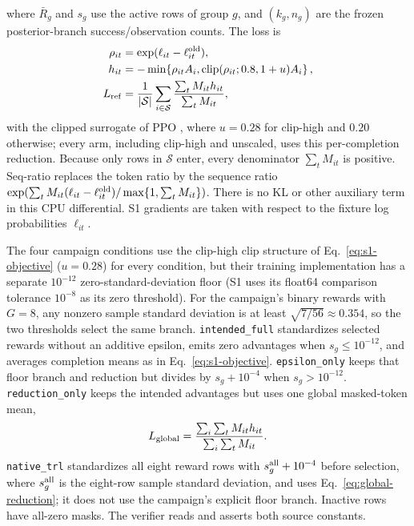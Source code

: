 \documentclass{article}
\begin{document}
where $\bar R_g$ and $s_g$ use the active rows of group $g$, and $(k_g,n_g)$
are the frozen posterior-branch success/observation counts.  The loss is
\begin{align}
 \rho_{it}&=\exp(\ell_{it}-\ell^{\rm old}_{it}), \nonumber\\
 h_{it}&=-\min\!\left\{\rho_{it}A_i,
     \operatorname{clip}(\rho_{it};0.8,1+u)A_i\right\}, \nonumber\\
 L_{\rm ref}&=\frac{1}{|\mathcal S|}\sum_{i\in\mathcal S}
   \frac{\sum_t M_{it}h_{it}}{\sum_t M_{it}},
 \label{eq:s1-objective}
\end{align}
with the clipped surrogate of PPO \citep{schulman2017ppo},
where $u=0.28$ for clip-high and $0.20$ otherwise; every arm, including
clip-high and unscaled, uses this per-completion reduction.  Because only rows in $\mathcal S$
enter, every denominator $\sum_tM_{it}$ is positive.  Seq-ratio replaces the token
ratio by the sequence ratio
$\exp(\sum_tM_{it}(\ell_{it}-\ell^{\rm old}_{it})/\max\{1,\sum_tM_{it}\})$.
There is no KL or other auxiliary term in this CPU differential.  S1 gradients
are taken with respect to the fixture log probabilities $\ell_{it}$.

The four campaign conditions use the clip-high clip structure of
Eq.~\eqref{eq:s1-objective} ($u=0.28$) for every condition, but their training
implementation has a separate $10^{-12}$ zero-standard-deviation floor (S1 uses
its float64 comparison tolerance $10^{-8}$ as its zero threshold).  For the
campaign's binary rewards with $G=8$, any nonzero sample standard deviation is
at least $\sqrt{7/56}\approx0.354$, so the two thresholds select the same branch.
\texttt{intended\_full} standardizes selected rewards without an additive
epsilon, emits zero advantages when $s_g\leq10^{-12}$, and averages completion
means as in Eq.~\eqref{eq:s1-objective}.  \texttt{epsilon\_only} keeps that
floor branch and reduction but divides by $s_g+10^{-4}$ when $s_g>10^{-12}$.
\texttt{reduction\_only} keeps the intended advantages but uses one global
masked-token mean,
\begin{equation}
 L_{\rm global}=\frac{\sum_{i}\sum_t M_{it}h_{it}}{\sum_{i}\sum_t M_{it}}.
 \label{eq:global-reduction}
\end{equation}
\texttt{native\_trl} standardizes all eight reward rows with
$s^{\rm all}_g+10^{-4}$ before selection, where $s^{\rm all}_g$ is the
eight-row sample standard deviation, and uses
Eq.~\eqref{eq:global-reduction}; it does not use the campaign's explicit floor
branch.  Inactive rows have all-zero masks.  The verifier reads and asserts
both source constants.
\end{document}
